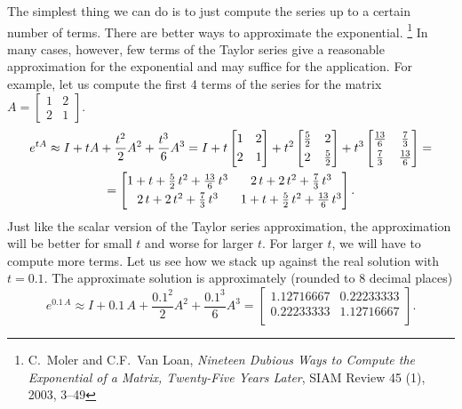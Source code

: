 The simplest thing we can do
is to just compute the series up to a certain number of terms.  There
are better ways to approximate the exponential.%
\footnote{C.\ Moler and C.F.\ Van Loan, \emph{Nineteen Dubious Ways
to Compute the Exponential of a Matrix, Twenty-Five Years Later}, SIAM Review
45 (1), 2003, 3--49}
In many cases, however,
few terms of the Taylor series give
a reasonable approximation for the exponential and may suffice for
the application.  For example, let us compute the first 4 terms of the
series for the matrix $A = 
\left[ \begin{smallmatrix}
1 & 2 \\
2 & 1
\end{smallmatrix} \right]$.
\begin{multline*}
e^{tA}
\approx
I + tA + \frac{t^2}{2}A^2 + \frac{t^3}{6}A^3
=
I + t
\begin{bmatrix}
1 & 2 \\
\noalign{\smallskip}
2 & 1
\end{bmatrix}
+ t^2
\begin{bmatrix}
\frac{5}{2} & 2 \\
\noalign{\smallskip}
2 & \frac{5}{2}
\end{bmatrix}
+ t^3
\begin{bmatrix}
\frac{13}{6} & \frac{7}{3} \\
\noalign{\smallskip}
\frac{7}{3} & \frac{13}{6}
\end{bmatrix}
=
\\
=
\begin{bmatrix}
1 + t + \frac{5}{2}\, t^2 + \frac{13}{6}\, t^3 &
   2\,t + 2\, t^2   + \frac{7}{3}\, t^3 \\
\noalign{\smallskip}
   2\,t + 2\, t^2   + \frac{7}{3}\, t^3 &
1 + t + \frac{5}{2}\, t^2 + \frac{13}{6}\, t^3
\end{bmatrix} .
\end{multline*}
Just like the scalar version of the Taylor series approximation, the
approximation will be better for small $t$ and worse for larger $t$.  For
larger $t$, we will have to compute more terms.
Let us see how we stack up against the real solution with $t=0.1$.  The
approximate solution is approximately (rounded to 8 decimal places)
\begin{equation*}
e^{0.1\,A} \approx
I + 0.1\,A + \frac{0.1^2}{2}A^2 + \frac{0.1^3}{6}A^3
=
\begin{bmatrix}
1.12716667 & 0.22233333 \\
0.22233333 & 1.12716667 \\
\end{bmatrix} .
\end{equation*}
